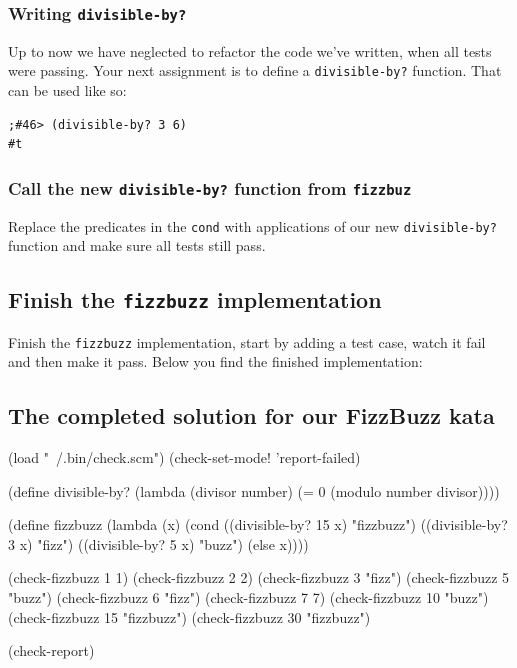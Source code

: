\documentclass[12pt,a4paper,english,twoside]{article}
\begin{document}
\subsubsection{Writing \texttt{divisible-by?}}
Up to now we have neglected to refactor the code 
we've written, when all tests were passing. Your next assignment is to define 
a \texttt{divisible-by?} function. That can be used like so:
\begin{lstlisting}
;#46> (divisible-by? 3 6)
#t
\end{lstlisting}
\subsubsection{Call the new \texttt{divisible-by?} function from 
\texttt{fizzbuz}}
Replace the predicates in the \texttt{cond} with applications of our new 
\texttt{divisible-by?} function and make sure all tests still pass.
\subsection{Finish the \texttt{fizzbuzz} implementation}
Finish the \texttt{fizzbuzz} implementation, start by adding a test case, 
watch it fail and then make it pass. 
Below you find the finished implementation:
\vfill
\pagebreak
\subsection{The completed solution for our FizzBuzz kata}
\begin{schemecode}
(load "~/.bin/check.scm")
(check-set-mode! 'report-failed)

(define divisible-by?
  (lambda (divisor number)
    (= 0 (modulo number divisor))))

(define fizzbuzz 
  (lambda (x) 
    (cond ((divisible-by? 15 x) "fizzbuzz")
          ((divisible-by? 3 x) "fizz")
          ((divisible-by? 5 x) "buzz")
          (else x))))

(check-fizzbuzz 1 1)
(check-fizzbuzz 2 2)
(check-fizzbuzz 3 "fizz")
(check-fizzbuzz 5 "buzz")
(check-fizzbuzz 6 "fizz")
(check-fizzbuzz 7 7)
(check-fizzbuzz 10 "buzz")
(check-fizzbuzz 15 "fizzbuzz")
(check-fizzbuzz 30 "fizzbuzz")

(check-report)
\end{schemecode}
\end{document}
